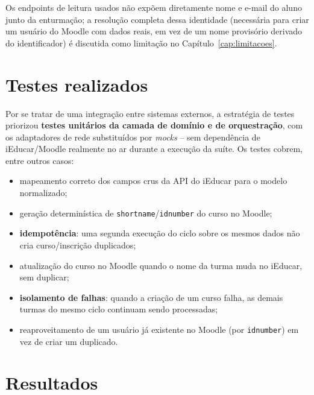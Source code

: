 \documentclass[
	12pt, openright, twoside, a4paper,
	english,
	brazil
	]{abntex2}
\begin{document}
Os endpoints de leitura usados n\~ao expõem diretamente nome e e-mail do aluno junto da
enturma\c{c}\~ao; a resolu\c{c}\~ao completa dessa identidade (necess\'aria para criar um usu\'ario
do Moodle com dados reais, em vez de um nome provis\'orio derivado do identificador) \'e discutida
como limita\c{c}\~ao no Cap\'itulo~\ref{cap:limitacoes}.

\chapter{Testes realizados}
\label{cap:testes}

Por se tratar de uma integra\c{c}\~ao entre sistemas externos, a estrat\'egia de testes priorizou
\textbf{testes unit\'arios da camada de dom\'inio e de orquestra\c{c}\~ao}, com os adaptadores de
rede substitu\'idos por \emph{mocks} -- sem depend\^encia de iEducar/Moodle realmente no ar durante
a execu\c{c}\~ao da su\'ite. Os testes cobrem, entre outros casos:

\begin{itemize}
  \item mapeamento correto dos campos crus da API do iEducar para o modelo normalizado;
  \item gera\c{c}\~ao determin\'istica de \texttt{shortname}/\texttt{idnumber} do curso no Moodle;
  \item \textbf{idempot\^encia}: uma segunda execu\c{c}\~ao do ciclo sobre os mesmos dados n\~ao
  cria curso/inscri\c{c}\~ao duplicados;
  \item atualiza\c{c}\~ao do curso no Moodle quando o nome da turma muda no iEducar, sem duplicar;
  \item \textbf{isolamento de falhas}: quando a cria\c{c}\~ao de um curso falha, as demais turmas
  do mesmo ciclo continuam sendo processadas;
  \item reaproveitamento de um usu\'ario j\'a existente no Moodle (por \texttt{idnumber}) em vez de
  criar um duplicado.
\end{itemize}

\chapter{Resultados}

\end{document}
